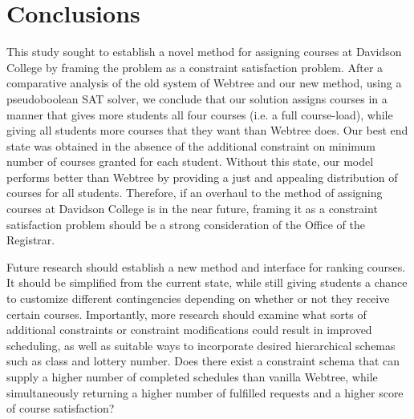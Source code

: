 
\section{Conclusions}
\label{sec:concl}

This study sought to establish a novel method for assigning courses at
Davidson College by framing the problem as a constraint satisfaction
problem. After a comparative analysis of the old system of Webtree and
our new method, using a pseudoboolean SAT solver, we conclude that our
solution assigns courses in a manner that gives more students all four
courses (i.e. a full course-load), while giving all students more
courses that they want than Webtree does. Our best end state was
obtained in the absence of the additional constraint on minimum number
of courses granted for each student. Without this state, our model
performs better than Webtree by providing a just and appealing
distribution of courses for all students. Therefore, if an overhaul to
the method of assigning courses at Davidson College is in the near
future, framing it as a constraint satisfaction problem should be a
strong consideration of the Office of the Registrar. 


Future research should establish a new method and interface for
ranking courses. It should be simplified from the current state, while
still giving students a chance to customize different contingencies
depending on whether or not they receive certain courses. Importantly, more
research should examine what sorts of additional constraints or constraint
modifications could result in improved scheduling, as well as suitable ways to
incorporate desired hierarchical schemas such as class and lottery number. Does
there exist a constraint schema that can supply a higher number of completed
schedules than vanilla Webtree, while simultaneously returning a higher number
of fulfilled requests and a higher score of course satisfaction?

